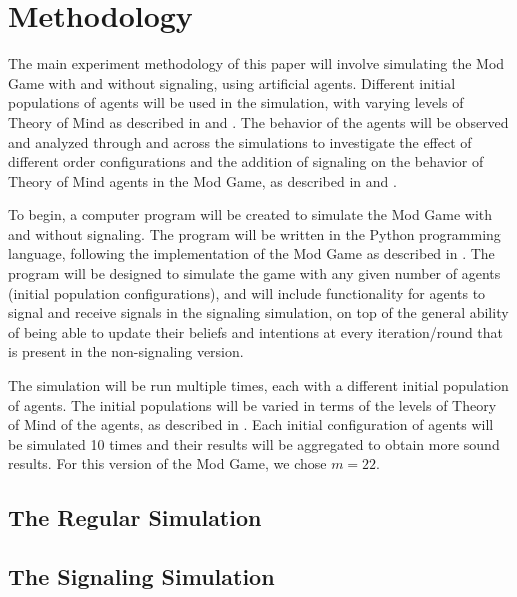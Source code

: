 \section{Methodology}\label{sec:methodology}

The main experiment methodology of this paper will involve simulating the Mod Game with and without signaling, using artificial agents. Different initial populations of agents will be used in the simulation, with varying levels of Theory of Mind as described in \cite{premack1978does} and \cite{liddle2006higher}. The behavior of the agents will be observed and analyzed through and across the simulations to investigate the effect of different order configurations and the addition of signaling on the behavior of Theory of Mind agents in the Mod Game, as described in \cite{veltman2019training} and \cite{frey2013cyclic}.

To begin, a computer program will be created to simulate the Mod Game with and without signaling. The program will be written in the Python \citep{van1995python} programming language, following the implementation of the Mod Game as described in \cite{veltman2019training}. The program will be designed to simulate the game with any given number of agents (initial population configurations), and will include functionality for agents to signal and receive signals in the signaling simulation, on top of the general ability of being able to update their beliefs and intentions at every iteration/round that is present in the non-signaling version.

The simulation will be run multiple times, each with a different initial population of agents. The initial populations will be varied in terms of the levels of Theory of Mind of the agents, as described in \cite{de2013much}. Each initial configuration of agents will be simulated 10 times and their results will be aggregated to obtain more sound results. For this version of the Mod Game, we chose $m = 22$.

\subsection{The Regular Simulation}



\subsection{The Signaling Simulation}

